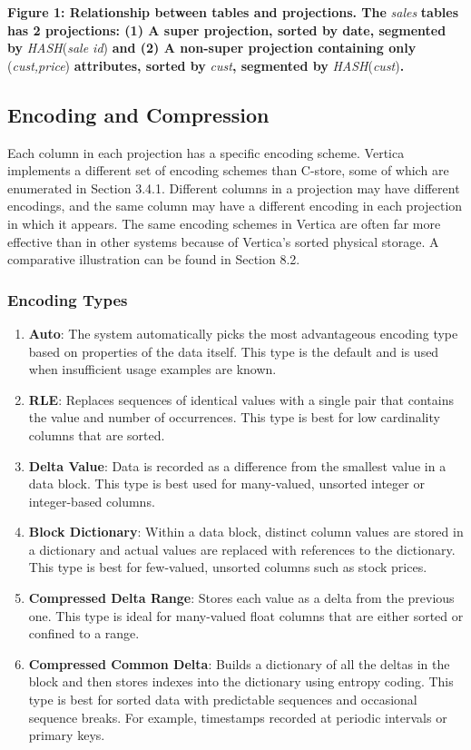 \documentclass[a4paper,12pt,notitlepage,twoside,openright]{article}
\begin{document}
\textbf{Figure 1: Relationship between tables and projections. The}
\emph{sales} \textbf{tables has 2 projections: (1) A super projection,
sorted by date, segmented by} \emph{HASH}(\emph{sale id}) \textbf{and
(2) A non-super projection containing only} (\emph{cust,price})
\textbf{attributes, sorted by} \emph{cust}\textbf{, segmented by}
\emph{HASH}(\emph{cust})\textbf{.}

\hypertarget{encoding-and-compression}{%
\subsection{Encoding and Compression}\label{encoding-and-compression}}

Each column in each projection has a specific encoding scheme. Vertica
implements a different set of encoding schemes than C-store, some of
which are enumerated in Section 3.4.1. Different columns in a projection
may have different encodings, and the same column may have a different
encoding in each projection in which it appears. The same encoding
schemes in Vertica are often far more effective than in other systems
because of Vertica's sorted physical storage. A comparative illustration
can be found in Section 8.2.

\hypertarget{encoding-types}{%
\subsubsection{Encoding Types}\label{encoding-types}}

\begin{enumerate}
\def\labelenumi{\arabic{enumi}.}
\item
  \textbf{Auto}: The system automatically picks the most advantageous
  encoding type based on properties of the data itself. This type is the
  default and is used when insufficient usage examples are known.
\item
  \textbf{RLE}: Replaces sequences of identical values with a single
  pair that contains the value and number of occurrences. This type is
  best for low cardinality columns that are sorted.
\item
  \textbf{Delta Value}: Data is recorded as a difference from the
  smallest value in a data block. This type is best used for
  many-valued, unsorted integer or integer-based columns.
\item
  \textbf{Block Dictionary}: Within a data block, distinct column values
  are stored in a dictionary and actual values are replaced with
  references to the dictionary. This type is best for few-valued,
  unsorted columns such as stock prices.
\item
  \textbf{Compressed Delta Range}: Stores each value as a delta from the
  previous one. This type is ideal for many-valued float columns that
  are either sorted or confined to a range.
\item
  \textbf{Compressed Common Delta}: Builds a dictionary of all the
  deltas in the block and then stores indexes into the dictionary using
  entropy coding. This type is best for sorted data with predictable
  sequences and occasional sequence breaks. For example, timestamps
  recorded at periodic intervals or primary keys.
\end{enumerate}
\end{document}
